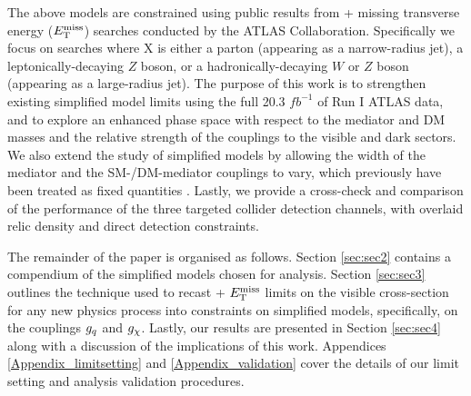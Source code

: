 The above models are constrained using public results from \monoX + missing transverse energy ($E_{\mathrm{T}}^{\mathrm{miss}}$) searches conducted by the ATLAS Collaboration. Specifically we focus on searches where X is either a parton (appearing as a narrow-radius jet), a leptonically-decaying $Z$ boson, or a hadronically-decaying $W$ or $Z$ boson (appearing as a large-radius jet). The purpose of this work is to strengthen existing simplified model limits \cite{} using the full 20.3 $fb^{-1}$ of Run I ATLAS data, and to explore an enhanced phase space with respect to the mediator and DM masses and the relative strength of the couplings to the visible and dark sectors. 
We also extend the study of simplified models by allowing the width of the mediator and the SM-/DM-mediator couplings to vary, which previously have been treated as fixed quantities \cite{}. Lastly, we provide a cross-check and comparison of the performance of the three targeted collider detection channels, with overlaid relic density and direct detection constraints.

The remainder of the paper is organised as follows. Section \ref{sec:sec2} contains a compendium of the simplified models chosen for analysis. Section \ref{sec:sec3} outlines the technique used to recast \monoX + $E_{\mathrm{T}}^{\mathrm{miss}}$ limits on the visible cross-section for any new physics process into constraints on simplified models, specifically, on the couplings $g_q$ and $g_{\chi}$. Lastly, our results are presented in Section \ref{sec:sec4} along with a discussion of the implications of this work. Appendices \ref{Appendix_limitsetting} and \ref{Appendix_validation} cover the details of our limit setting and analysis validation procedures.
